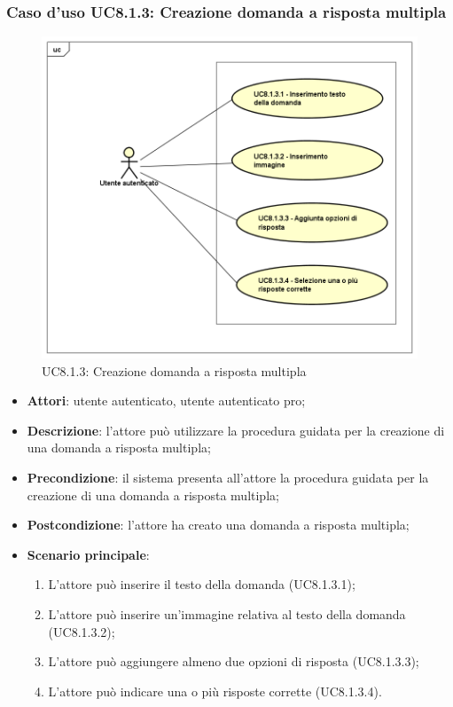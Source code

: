 \subsubsection{Caso d'uso UC8.1.3: Creazione domanda a risposta multipla}
	\label{UC8.1.3}
	\begin{figure}[ht]
		\centering
			\includegraphics[scale=0.45,keepaspectratio]{UML/UC8_1_3.png}
		\caption{UC8.1.3: Creazione domanda a risposta multipla}
	\end{figure}
	\FloatBarrier
	\begin{itemize}
		\item
			\textbf{Attori}: utente autenticato, utente autenticato pro;
		\item		
			\textbf{Descrizione}: l'attore può utilizzare la procedura guidata per la creazione di una domanda a risposta multipla;
		\item
			\textbf{Precondizione}: il sistema presenta all'attore la procedura guidata per la creazione di una domanda a risposta multipla;
		\item
			\textbf{Postcondizione}: l'attore ha creato una domanda a risposta multipla;
		\item
			\textbf{Scenario principale}:
	       		\begin{enumerate}
	       			\item
	       			L'attore può inserire il testo della domanda (UC8.1.3.1);
	       			\item
	       			L'attore può inserire un'immagine relativa al testo della domanda (UC8.1.3.2);
	       			\item
	       			L'attore può aggiungere almeno due opzioni di risposta (UC8.1.3.3);
					\item
					L'attore può indicare una o più risposte corrette (UC8.1.3.4).
	 			\end{enumerate}
	\end{itemize}

